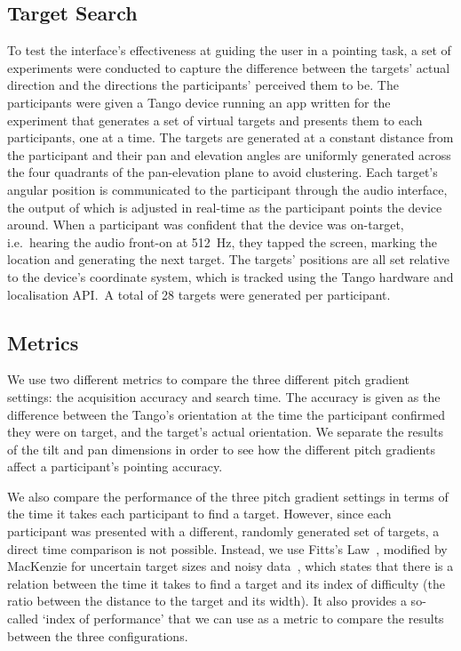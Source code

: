 \documentclass[]{interact}
\begin{document}
\subsection{Target Search}

To test the interface's effectiveness at guiding the user in a pointing task, a set of experiments were conducted to capture the difference between the targets' actual direction and the directions the participants' perceived them to be.
The participants were given a Tango device running an app written for the experiment that generates a set of virtual targets and presents them to each participants, one at a time. 
The targets are generated at a constant distance from the participant and their pan and elevation angles are uniformly generated across the four quadrants of the pan-elevation plane to avoid clustering.
Each target's angular position is communicated to the participant through the audio interface, the output of which is adjusted in real-time as the participant points the device around. 
When a participant was confident that the device was on-target, i.e.~hearing the audio front-on at \SI{512}{\hertz}, they tapped the screen, marking the location and generating the next target.
The targets' positions are all set relative to the device's coordinate system, which is tracked using the Tango hardware and localisation API.\
A total of 28 targets were generated per participant. 

\subsection{Metrics}

We use two different metrics to compare the three different pitch gradient settings: the acquisition accuracy and search time.
The accuracy is given as the difference between the Tango's orientation at the time the participant confirmed they were on target, and the target's actual orientation.
We separate the results of the tilt and pan dimensions in order to see how the different pitch gradients affect a participant's pointing accuracy. 

We also compare the performance of the three pitch gradient settings in terms of the time it takes each participant to find a target.
However, since each participant was presented with a different, randomly generated set of targets, a direct time comparison is not possible.
Instead, we use Fitts's Law~\citep{fitts1954information}, modified by MacKenzie for uncertain target sizes and noisy data~\citep{mackenzie1992fitts}, which states that there is a relation between the time it takes to find a target and its index of difficulty (the ratio between the distance to the target and its width).
It also provides a so-called `index of performance' that we can use as a metric to compare the results between the three configurations. 
\end{document}
